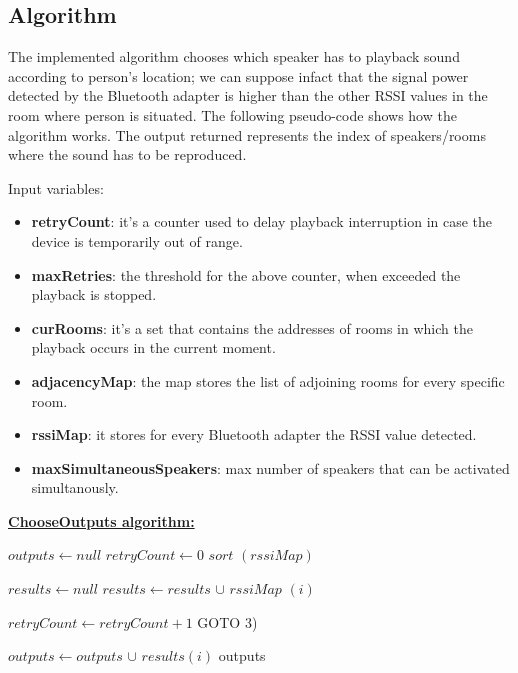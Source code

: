 \documentclass[conference]{IEEEtran}
\begin{document}
\subsection{Algorithm}
The implemented algorithm chooses which speaker has to playback sound according to person's location; we can suppose infact that the signal power detected by the Bluetooth adapter is higher than the other RSSI values in the room where person is situated. The following pseudo-code shows how the algorithm works. The output returned represents the index of speakers/rooms where the sound has to be reproduced.

Input variables:
\begin{itemize}
\item \textbf{retryCount}: it's a counter used to delay playback interruption in case the device is temporarily out of range.
\item \textbf{maxRetries}: the threshold for the above counter, when exceeded the playback is stopped.
\item \textbf{curRooms}: it's a set that contains the addresses of rooms in which the playback occurs in the current moment.
\item \textbf{adjacencyMap}: the map stores the list of adjoining rooms for every specific room.
\item \textbf{rssiMap}: it stores for every Bluetooth adapter the RSSI value detected.
\item \textbf{maxSimultaneousSpeakers}: max number of speakers that can be activated simultanously.
\end{itemize}
\textbf{\underline{ChooseOutputs algorithm:}}
\vspace{0.3cm}
\begin{algorithmic}[1]

\STATE $outputs \gets null$ 
\STATE $retryCount \gets 0$
\STATE $sort$ $(rssiMap)$ 

\STATE $results \gets null$
\STATE $results \gets results$ $\cup$ $rssiMap$ $(i)$ 
\ENDFOR

\STATE $ retryCount \gets retryCount + 1 $ 
\STATE GOTO 3)
\ENDIF

		\STATE $outputs \gets outputs$ $\cup$ $results(i)$ 
	\ENDIF
\ENDFOR
\RETURN outputs
\end{algorithmic}
\end{document}
